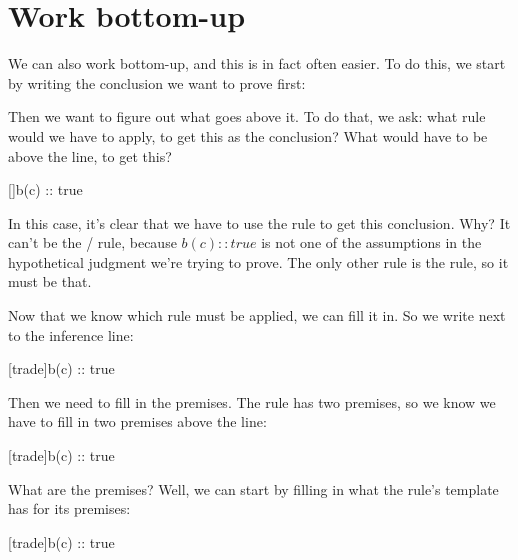 \documentclass[../../../main.tex]{subfiles}
\begin{document}
\section{Work bottom-up}

We can also work bottom-up, and this is in fact often easier. To do this, we start by writing the conclusion we want to prove first:

\begin{prooftree*}
  \hypo{}
  \hypo{}
\end{prooftree*}

\noindent
Then we want to figure out what goes above it. To do that, we ask: what rule would we have to apply, to get this as the conclusion? What would have to be above the line, to get this?

\begin{prooftree*}
  \ellipsis{}{}
  []{b(c) :: true}
\end{prooftree*}

\noindent
In this case, it's clear that we have to use the  rule to get this conclusion. Why? It can't be the \startrule/ rule, because $b(c) :: true$ is not one of the assumptions in the hypothetical judgment we're trying to prove. The only other rule is the  rule, so it must be that.

Now that we know which rule must be applied, we can fill it in. So we write  next to the inference line:

\begin{prooftree*}
  \hypo{}
  \hypo{}
  [trade]{b(c) :: true}
\end{prooftree*}

\noindent
Then we need to fill in the premises. The  rule has two premises, so we know we have to fill in two premises above the line:

\begin{prooftree*}
  [trade]{b(c) :: true}
\end{prooftree*}

\noindent
What are the premises? Well, we can start by filling in what the rule's template has for its premises:

\begin{prooftree*}
  [trade]{b(c) :: true}
\end{prooftree*}
\end{document}
